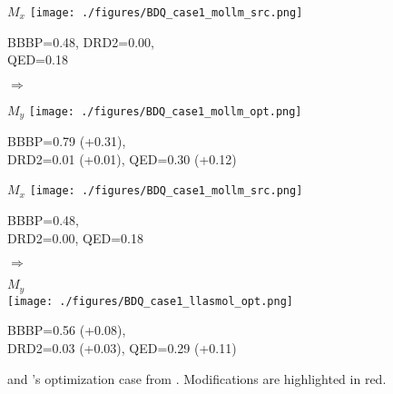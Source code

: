 

\begin{figure}[p]
    \centering
    \begin{minipage}{0.43\linewidth}
        \centering
        \tiny $M_x$
        \texttt{[image: ./figures/BDQ\_case1\_mollm\_src.png]}
        \par\vspace{2pt}
        \tiny BBBP=0.48, DRD2=0.00, \\
        \tiny QED=0.18
    \end{minipage}
    \hfill
    \begin{minipage}{0.1\linewidth}
        \centering \Large$\Rightarrow$\\
        \raggedright \tiny \mollm
        \raggedright \tiny {}
    \end{minipage}
    \hfill
    \begin{minipage}{0.44\linewidth}
        \centering
        \tiny $M_y$
        \texttt{[image: ./figures/BDQ\_case1\_mollm\_opt.png]}
        \par\vspace{2pt}
        \tiny BBBP=0.79 (+0.31),\\ 
        \tiny DRD2=0.01 (+0.01), QED=0.30 (+0.12)
    \end{minipage}

    \vspace{1em}

    \begin{minipage}{0.43\linewidth}
        \centering
        \tiny $M_x$
        \texttt{[image: ./figures/BDQ\_case1\_mollm\_src.png]}
        \par\vspace{2pt}
        \tiny BBBP=0.48, \\
        \tiny DRD2=0.00, QED=0.18
    \end{minipage}
    \hfill
    \begin{minipage}{0.1\linewidth}
        \centering \Large$\Rightarrow$\\
        \raggedright \tiny \LlaSMol
        \raggedright \tiny {}
    \end{minipage}
    \hfill
    \begin{minipage}{0.44\linewidth}
        \centering
        \tiny $M_y$\\
        \texttt{[image: ./figures/BDQ\_case1\_llasmol\_opt.png]}
        \par\vspace{1pt}
        \tiny BBBP=0.56 (+0.08), \\ 
        \tiny DRD2=0.03 (+0.03), QED=0.29 (+0.11)
    \end{minipage}
    \caption{{\mollmSixGenM} and {\LlaSMolM}'s optimization case from \BDQ. Modifications are highlighted in red.}
    \label{fig:BDQ_case1_appendix}
\end{figure}

